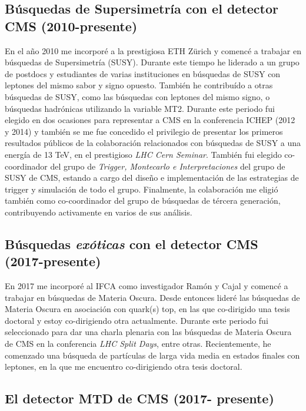 \subsection{Búsquedas de Supersimetría con el detector CMS (2010-presente)}

En el año 2010 me incorporé a la prestigiosa ETH Zürich y comencé a trabajar en búsquedas de Supersimetría (SUSY). Durante este tiempo he liderado a un grupo de postdocs y estudiantes de varias instituciones en búsquedas de SUSY con leptones del mismo sabor y signo opuesto. También he contribuído a otras búsquedas de SUSY, como las búsquedas con leptones del mismo signo, o búsquedas hadrónicas utilizando la variable MT2. Durante este periodo fui elegido en dos ocasiones para representar a CMS en la conferencia ICHEP (2012 y 2014) y también se me fue concedido el privilegio de presentar los primeros resultados públicos de la colaboración relacionados con búsquedas de SUSY a una energía de 13 TeV, en el prestigioso \emph{LHC Cern Seminar}. También fui elegido co-coordinador del grupo de \emph{Trigger, Montecarlo e Interpretaciones} del grupo de SUSY de CMS, estando a cargo del diseño e implementación de las estrategias de trigger y simulación de todo el grupo. Finalmente, la colaboración me eligió también como co-coordinador del grupo de búsquedas de tércera generación, contribuyendo activamente en varios de sus análisis.  

\subsection{Búsquedas \emph{exóticas} con el detector CMS (2017-presente)}

En 2017 me incorporé al IFCA como investigador Ramón y Cajal y comencé a trabajar en búsquedas de Materia Oscura. Desde entonces lideré las búsquedas de Materia Oscura en asociación con quark(s) top, en las que co-dirigido una tesis doctoral y estoy co-dirigiendo otra actualmente. Durante este periodo fui seleccionado para dar una charla plenaria con las búsquedas de Materia Oscura de CMS en la conferencia \emph{LHC Split Days}, entre otras. Recientemente, he comenzado una búsqueda de partículas de larga vida media en estados finales con leptones, en la que me encuentro co-dirigiendo otra tesis doctoral.


\subsection{El detector MTD de CMS (2017- presente)}

